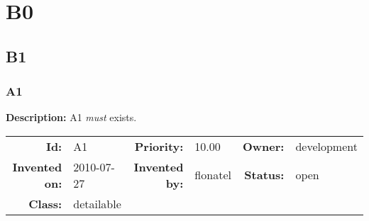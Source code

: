 \chapter{B0}
\section{B1}
\subsection{A1}\label{A1}
\textbf{Description:} A1 \textsl{must} exists.

\par
{\small \begin{center}\begin{tabular}{rlrlrl}
\textbf{Id:} & A1  & \textbf{Priority:} & 10.00  & \textbf{Owner:} & development\\ 
\textbf{Invented on:} & 2010-07-27  & \textbf{Invented by:} & flonatel  & \textbf{Status:} & open \\ 
\textbf{Class:} & detailable  & & & \end{tabular}\end{center} }
